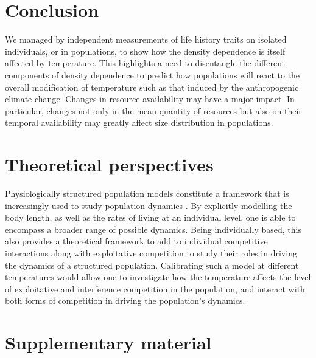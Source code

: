\section{Conclusion}

We managed by independent measurements of life history traits on isolated
individuals, or in populations, to show how the density dependence is itself
affected by temperature. This highlights a need to disentangle the different
components of density dependence to predict how populations will react to the
overall modification of temperature such as that induced by the anthropogenic
climate change. Changes in resource availability may have a major impact. In
particular, changes not only in the mean quantity of resources but also on their
temporal availability may greatly affect size distribution in populations.

\section{Theoretical perspectives}

Physiologically structured population models \autocite{metz1986a,de-roos1992a} constitute a framework that is increasingly used to study
population dynamics \autocite{marty2011a,moenickes2011a}.
By explicitly modelling the body length, as well as the rates of living at an individual
level, one is able to encompass a broader range of possible dynamics. Being
individually based, this also provides a theoretical framework to add to
individual competitive interactions along with exploitative competition to study
their roles in driving the dynamics of a structured population. Calibrating such
a model at different temperatures would allow one to investigate how the
temperature affects the level of exploitative and interference competition in
the population, and interact with both forms of competition in driving the
population's dynamics.

















\newpage
\section{Supplementary material}

